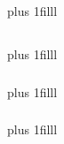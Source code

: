 \documentclass[fleqn]{beamer} %
\newcommand{\sectionIIIsubsectionItitle}{}
\newcommand{\sectionIIIsubsectionIItitle}{}
\newcommand{\sectionIIIsubsectionIIItitle}{}
\newcommand{\btVFill}{\vskip0pt plus 1filll}
\begin{document}
		\subsection{\sectionIIIsubsectionItitle}\label{sectionIIIsubsectionI}

			\begin{frame}
				\frametitle{\sectionIIIsubsectionItitle}

				\bigskip

				
			
				\btVFill
			

			\end{frame}

			\begin{frame}
				\frametitle{\sectionIIIsubsectionItitle}
		
			\end{frame}

		\subsection{\sectionIIIsubsectionIItitle}\label{sectionIIIsubsectionII}	

			\begin{frame}
				\frametitle{\sectionIIIsubsectionIItitle}

				\bigskip

				

				\btVFill

			\end{frame}

			\begin{frame}
				\frametitle{\sectionIIIsubsectionIItitle}

				\bigskip
			
			
				\btVFill

			\end{frame}

			\begin{frame}
				\frametitle{\sectionIIIsubsectionIItitle}

				\bigskip

				

				\btVFill
				
			\end{frame}

		\subsection{\sectionIIIsubsectionIIItitle}\label{sectionIIIsubsectionIII}	
\end{document}
